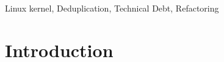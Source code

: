 \documentclass[10pt,conference]{IEEEtran}
\begin{document}

\begin{IEEEkeywords}
Linux kernel, Deduplication, Technical Debt, Refactoring
\end{IEEEkeywords}

\section{Introduction}\label{sec:introduction}
\end{document}

